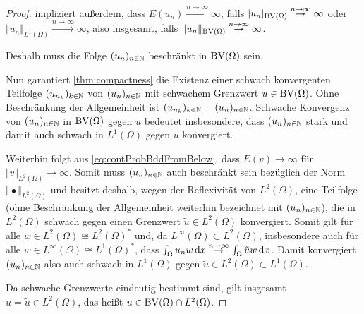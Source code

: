 \begin{proof}
   impliziert außerdem, dass
  $E(u_n)\overset{n\to\infty}{\to}\infty$, falls
  $|u_n|_{\textup{BV}(\Omega)}\overset{n\to\infty}{\to}\infty$ oder 
  $\Vert u_n\Vert_{L^1(\Omega)}\overset{n\to\infty}{\to}\infty$, also 
  insgesamt, falls
  $\Vert u_n\Vert_{\textup{BV}(\Omega)}\overset{n\to\infty}{\to}\infty$.

  Deshalb muss die Folge $(u_n)_{n\in\mathbb{N}}$ beschränkt in $\textup{BV}(\Omega)$ sein.

  \medbreak
  Nun garantiert \cref{thm:compactness} die Existenz einer schwach konvergenten
  Teilfolge $(u_{n_k})_{k\in\mathbb{N}}$ von $(u_n)_{n\in\mathbb{N}}$ mit schwachem Grenzwert
  $u\in\textup{BV}(\Omega)$. Ohne Beschränkung der Allgemeinheit
  ist $(u_{n_k})_{k\in\mathbb{N}}=(u_n)_{n\in\mathbb{N}}$.
  Schwache Konvergenz von $(u_n)_{n\in\mathbb{N}}$ in $\textup{BV}(\Omega)$ gegen
  $u$ bedeutet insbesondere, dass $(u_n)_{n\in\mathbb{N}}$ stark und damit
  auch schwach in $L^1(\Omega)$ gegen $u$ konvergiert.

  \medbreak
  Weiterhin folgt aus \cref{eq:contProbBddFromBelow}, dass
  $E(v)\rightarrow\infty$ für
  $\Vert v\Vert_{L^2(\Omega)}\rightarrow\infty$. Somit muss $(u_n)_{n\in\mathbb{N}}$ 
  auch beschränkt sein bezüglich der Norm $\Vert\bullet\Vert_{L^2(\Omega)}$ und
  besitzt deshalb, wegen der Reflexivität von $L^2(\Omega)$,
  eine Teilfolge (ohne Beschränkung der Allgemeinheit weiterhin bezeichnet mit
  $(u_n)_{n\in\mathbb{N}}$), die
  in $L^2(\Omega)$ schwach gegen einen Grenzwert 
  $\tilde{u}\in L^2(\Omega)$ konvergiert. Somit gilt für alle $w\in
  L^2(\Omega)\cong L^2(\Omega)^\ast$ und, da $L^\infty(\Omega)\subset
  L^2(\Omega)$, insbesondere 
  auch für alle $w\in
  L^\infty(\Omega)\cong L^1(\Omega)^\ast$, dass 
  $\int_\Omega u_n w\,\mathrm{d}x \overset{n\to\infty}{\to}\int_\Omega \tilde{u} w\,\mathrm{d}x$. 
  Damit konvergiert $(u_n)_{n\in\mathbb{N}}$ also auch schwach in $L^1(\Omega)$ gegen
  $\tilde{u}\in L^2(\Omega)\subset L^1(\Omega)$. 

  \medbreak
  Da schwache Grenzwerte eindeutig bestimmt sind, gilt insgesamt $u=\tilde u
  \in L^2(\Omega)$, das heißt $u\in\textup{BV}(\Omega)\cap
  L^2(\Omega)$.



\end{proof}
